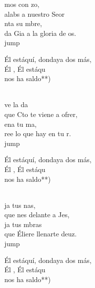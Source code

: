 \begin{cancion}%
	mos con zo,\\
	alabs a nuestro Seor\\
	nta su mbre, \\
	da Gia a la gloria de os.\\jump\\
	\begin{chorus}%
	Él estáquí, dondaya dos más,\\
	Él , Él estáqu    \\
	nos ha saldo**)\\
	\end{chorus}%
	\jump\\
	ve la da \\
	que Cto te viene a ofrer,\\
	ena tu ma, \\
	ree lo que hay en tu r.\\jump\\
	\begin{chorus}%
	Él estáquí, dondaya dos más,\\
	Él , Él estáqu    \\
	nos ha saldo**)\\
	\end{chorus}%
	\jump\\
	ja tus nas, \\
	que nes delante a Jes, \\
	ja tus mbras \\
	que Éliere llenarte deuz.\\jump\\
	\begin{chorus}%
	Él estáquí, dondaya dos más,\\
	Él , Él estáqu    \\
	nos ha saldo**)\\
	\end{chorus}%
	\jump\\
\end{cancion}%
